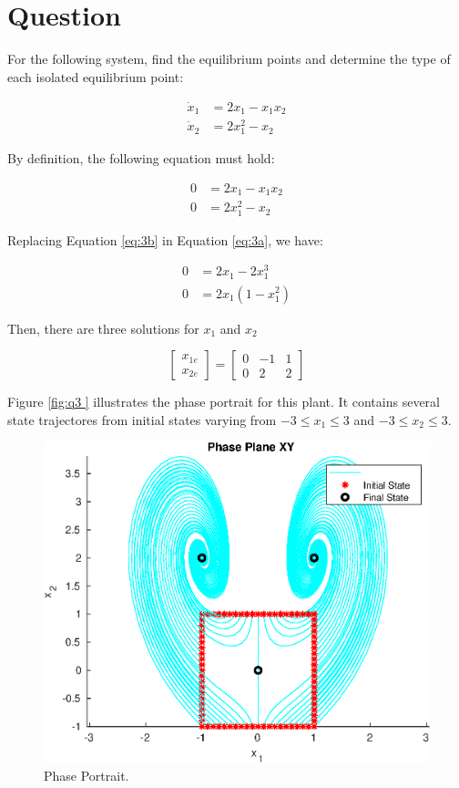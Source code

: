 \documentclass[a4paper,10pt]{article}
\begin{document}
\section{Question}
For the following system, find the equilibrium points and determine the type of each isolated equilibrium point:

\begin{eqnarray*}
\dot{x}_1 &= 2{x}_1 - {x}_1{x}_2 \\
\dot{x}_2 &= 2{x}^2_1 - {x}_2 
\end{eqnarray*}

By definition, the following equation must hold:

\begin{eqnarray}
0 &= 2{x}_1 - {x}_1{x}_2 \label{eq:3a} \\ 
0 &= 2{x}^2_1 - {x}_2   \label{eq:3b}
\end{eqnarray}

Replacing Equation \ref{eq:3b} in Equation \ref{eq:3a}, we have:

\begin{eqnarray*}
0 &= 2{x}_1 - 2{x}^3_1 \\
0 &= 2{x}_1(1 - {x}^2_1)
\end{eqnarray*}

Then, there are three solutions for $x_1$ and $x_2$

\begin{equation}
\begin{bmatrix}
x_{1e}\\x_{2e}
\end{bmatrix}=
\begin{bmatrix}
 0 & -1 & 1 \\
 0 & 2 & 2 
\end{bmatrix}
\end{equation}

Figure \ref{fig:q3 } illustrates the phase portrait for this plant. It contains several state trajectores from initial states varying from $-3\leq x_1\leq 3$ and $-3\leq x_2\leq 3$.

\begin{figure}[H]
  \centering
  \includegraphics[width=.8\linewidth]{question3.eps}
  \caption{Phase Portrait.} \label{fig:q3}
\end{figure}
\end{document}

